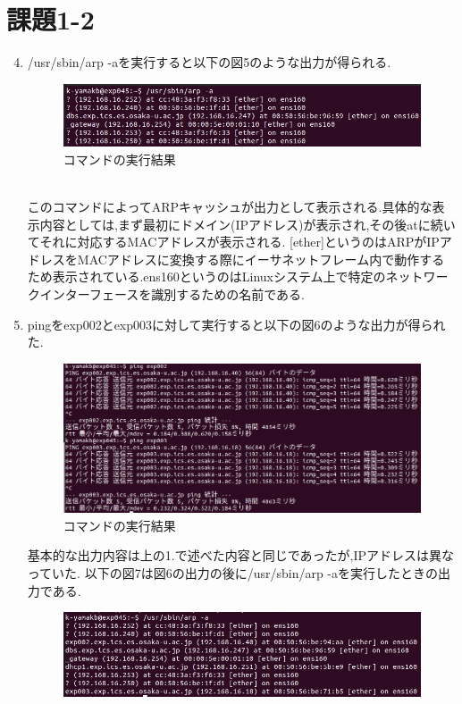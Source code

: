 \documentclass[dvipdfmx]{jarticle}
\begin{document}
\section{課題1-2}
\begin{enumerate}
    \setcounter{enumi}{3}
    \item /usr/sbin/arp -aを実行すると以下の図5のような出力が得られる.
    \begin{figure}[h]
        \centering
        \includegraphics[width=12cm]{1-2-4.png}
        \caption{コマンドの実行結果}
    \end{figure}
    \\このコマンドによってARPキャッシュが出力として表示される.具体的な表示内容としては,まず最初にドメイン(IPアドレス)が表示され,その後atに続いてそれに対応するMACアドレスが表示される.
    [ether]というのはARPがIPアドレスをMACアドレスに変換する際にイーサネットフレーム内で動作するため表示されている.ens160というのはLinuxシステム上で特定のネットワークインターフェースを識別するための名前である.
    \item pingをexp002とexp003に対して実行すると以下の図6のような出力が得られた.
    \begin{figure}[h]
        \centering
        \includegraphics[width=12cm]{1-2-5.png}
        \caption{コマンドの実行結果}
    \end{figure}
    基本的な出力内容は上の1.で述べた内容と同じであったが,IPアドレスは異なっていた.
    以下の図7は図6の出力の後に/usr/sbin/arp -aを実行したときの出力である.
    \begin{figure}[h]
        \centering
        \includegraphics[width=12cm]{1-2-5-2.png}

\end{figure}
\end{enumerate}
\end{document}
